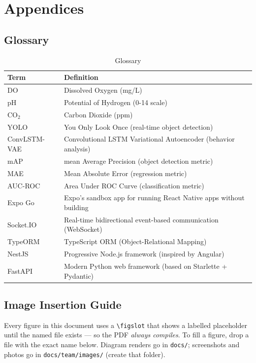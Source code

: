 \documentclass[12pt,a4paper,oneside]{article}
\begin{document}
\newpage
\section{Appendices}

\subsection{Glossary}
\begin{table}[H]
    \centering
    \begin{tabularx}{\textwidth}{lX}
        \toprule
        \textbf{Term} & \textbf{Definition} \\
        \midrule
        DO & Dissolved Oxygen (mg/L) \\
        pH & Potential of Hydrogen (0-14 scale) \\
        CO$_2$ & Carbon Dioxide (ppm) \\
        YOLO & You Only Look Once (real-time object detection) \\
        ConvLSTM-VAE & Convolutional LSTM Variational Autoencoder (behavior analysis) \\
        mAP & mean Average Precision (object detection metric) \\
        MAE & Mean Absolute Error (regression metric) \\
        AUC-ROC & Area Under ROC Curve (classification metric) \\
        Expo Go & Expo's sandbox app for running React Native apps without building \\
        Socket.IO & Real-time bidirectional event-based communication (WebSocket) \\
        TypeORM & TypeScript ORM (Object-Relational Mapping) \\
        NestJS & Progressive Node.js framework (inspired by Angular) \\
        FastAPI & Modern Python web framework (based on Starlette + Pydantic) \\
        \bottomrule
    \end{tabularx}
    \caption{Glossary}
\end{table}

\subsection{Image Insertion Guide}
Every figure in this document uses a \texttt{\textbackslash figslot} that shows a labelled
placeholder until the named file exists --- so the PDF \emph{always compiles}. To fill a figure,
drop a file with the exact name below. Diagram renders go in \texttt{docs/}; screenshots and
photos go in \texttt{docs/team/images/} (create that folder).
\end{document}
